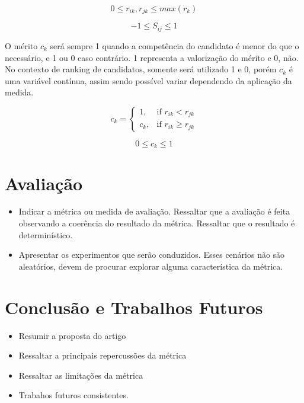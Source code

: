 \documentclass[preprint,12pt]{elsarticle}
\begin{document}
\begin{equation}
0 \leq r_{ik}, r_{jk} \leq max(r_k)
\end{equation}

\begin{equation}
-1 \leq S_{ij} \leq 1
\end{equation}

O mérito $c_{k}$ será sempre 1 quando a competência do candidato é menor do que o necessário, e 1 ou 0 caso contrário. 1 representa a valorização do mérito e 0, não. No contexto de ranking de candidatos, somente será utilizado 1 e 0, porém $c_{k}$ é uma variável contínua, assim sendo possível variar dependendo da aplicação da medida.

\begin{equation}
c_{k} = \begin{cases} 1, & \text{if } r_{ik} < r_{jk} \\ c_{k}, & \text{if } r_{ik} \geq r_{jk} \end{cases}
\end{equation}

\begin{equation}
0 \leq c_k \leq 1
\end{equation}

\section{Avaliação}
\label{sec:sample4}
\begin{itemize}
\item Indicar a métrica ou medida de avaliação. Ressaltar que a avaliação é feita observando a coerência do resultado da métrica. Ressaltar que o resultado é determinístico. 
\item Apresentar os experimentos que serão conduzidos. Esses cenários não são aleatórios, devem de procurar explorar alguma característica da métrica.
\end{itemize}

\section{Conclusão e Trabalhos Futuros}
\label{sec:sample5}
\begin{itemize}
\item Resumir a proposta do artigo
\item Ressaltar a principais repercussões da métrica 
\item Ressaltar as limitações da métrica
\item Trabahos futuros consistentes.
\end{itemize}
\appendix
\end{document}
